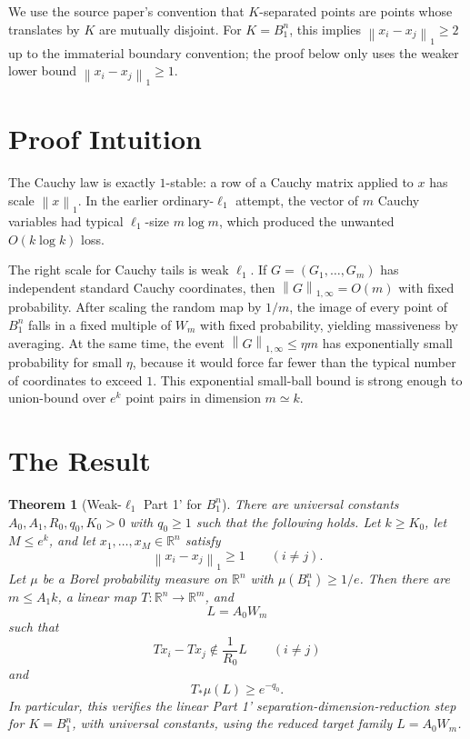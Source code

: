 \documentclass[11pt]{article}
\newtheorem{theorem}{Theorem}
\newcommand{\R}{\mathbb R}
\newcommand{\norm}[1]{\left\lVert #1 \right\rVert}
\begin{document}
We use the source paper's convention that \(K\)-separated points are points
whose translates by \(K\) are mutually disjoint.  For \(K=B_1^n\), this implies
\(\norm{x_i-x_j}_1\ge 2\) up to the immaterial boundary convention; the proof
below only uses the weaker lower bound \(\norm{x_i-x_j}_1\ge 1\).

\section*{Proof Intuition}

The Cauchy law is exactly \(1\)-stable: a row of a Cauchy matrix applied to
\(x\) has scale \(\norm{x}_1\).  In the earlier ordinary-\(\ell_1\) attempt,
the vector of \(m\) Cauchy variables had typical \(\ell_1\)-size
\(m\log m\), which produced the unwanted \(O(k\log k)\) loss.

The right scale for Cauchy tails is weak \(\ell_1\).  If
\(G=(G_1,\ldots,G_m)\) has independent standard Cauchy coordinates, then
\(\norm{G}_{1,\infty}=O(m)\) with fixed probability.  After scaling the random
map by \(1/m\), the image of every point of \(B_1^n\) falls in a fixed multiple
of \(W_m\) with fixed probability, yielding massiveness by averaging.  At the
same time, the event \(\norm{G}_{1,\infty}\le \eta m\) has exponentially small
probability for small \(\eta\), because it would force far fewer than the
typical number of coordinates to exceed \(1\).  This exponential small-ball
bound is strong enough to union-bound over \(e^k\) point pairs in dimension
\(m\simeq k\).

\section*{The Result}

\begin{theorem}[Weak-\(\ell_1\) Part 1' for \(B_1^n\)]
\label{thm:main}
There are universal constants \(A_0,A_1,R_0,q_0,K_0>0\) with
\(q_0\ge 1\) such that the following holds.  Let \(k\ge K_0\), let
\(M\le e^k\), and let \(x_1,\ldots,x_M\in\R^n\) satisfy
\[
  \norm{x_i-x_j}_1\ge 1 \qquad (i\ne j).
\]
Let \(\mu\) be a Borel probability measure on \(\R^n\) with
\(\mu(B_1^n)\ge 1/e\).  Then there are \(m\le A_1 k\), a linear map
\(T:\R^n\to\R^m\), and
\[
  L=A_0 W_m
\]
such that
\[
  T x_i - T x_j \notin \frac{1}{R_0}L
  \qquad (i\ne j)
\]
and
\[
  T_*\mu(L)\ge e^{-q_0}.
\]
In particular, this verifies the linear Part 1' separation-dimension-reduction
step for \(K=B_1^n\), with universal constants, using the reduced target
family \(L=A_0W_m\).
\end{theorem}
\end{document}
